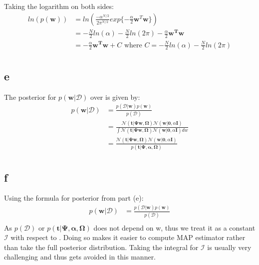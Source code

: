 \documentclass[a4paper]{article}
\begin{document}
Taking the logarithm on both sides:
\begin{align*}
    ln(p(\pmb{w})) &= ln\left( \frac{-\alpha^{N/2}}{2\pi^{N/2}}exp\{-\frac{\alpha}{2}\pmb{w}^{T}\pmb{w} \}\right) \\
    &= -\frac{N}{2}ln(\alpha) - \frac{N}{2}ln(2\pi) - \frac{\alpha}{2}\pmb{w^Tw} \\
    &= - \frac{\alpha}{2}\pmb{w^Tw}  + C \text{\ where \ } C = -\frac{N}{2}ln(\alpha) - \frac{N}{2}ln(2\pi) \\
\end{align*}{}

\subsection*{e}
The posterior for $p(\pmb{w}|\mathcal{D})$ over  is given by:
\begin{align*}
    p(\pmb{w}|\mathcal{D}) &= \frac{p(\mathcal{D}|\pmb{w})p(\pmb{w})}{p(\mathcal{D})} \\
    &= \frac{\mathcal{N}(\textbf{t} |\pmb{\Psi}\textbf{w}, \pmb{\Omega})\mathcal{N}(\pmb{w}|\pmb{0}, \alpha \pmb{I})}{\int \mathcal{N}(\textbf{t} |\pmb{\Psi}\textbf{w}, \pmb{\Omega})\mathcal{N}(\pmb{w}|\pmb{0}, \alpha \pmb{I})dw} \\
    &= \frac{\mathcal{N}(\textbf{t} |\pmb{\Psi}\textbf{w}, \pmb{\Omega})\mathcal{N}(\pmb{w}|\pmb{0}, \alpha \pmb{I})}{p(\pmb{t}|\pmb{\Psi}, \pmb{\alpha}, \pmb{\Omega})} \\
\end{align*}{}

\subsection*{f}
Using the formula for posterior from part (e):
\begin{align*}
    p(\pmb{w}|\mathcal{D}) &= \frac{p(\mathcal{D}|\pmb{w})p(\pmb{w})}{p(\mathcal{D})} \\
\end{align*}{}
As $p(\mathcal{D})$ or $p(\pmb{t}|\pmb{\Psi}, \pmb{\alpha}, \pmb{\Omega})$ does not depend on w, thus we treat it as a constant $\mathcal{I}$ with respect to . Doing so makes it easier to compute MAP estimator rather than take the full posterior distribution. Taking the integral for $\mathcal{I}$ is usually very challenging and thus gets avoided in this manner.
\end{document}
